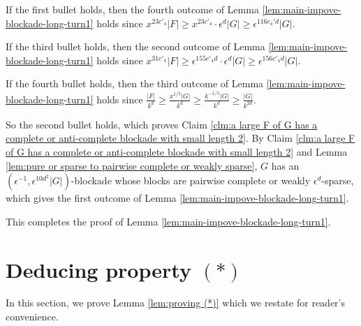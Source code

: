 \documentclass[a4paper,11pt]{article}
\let\oldendproof\endproof
\renewenvironment{proof}[1][\proofname]{%
	\oldproof[\normalfont\bfseries #1]%
}{\oldendproof}
\renewcommand{\qedsymbol}{$\square$}%
\newenvironment{subproof}[1][\normalfont\it Subproof]{%
	\renewcommand{\qedsymbol}{{\tiny{$\blacksquare$}}}%
	\begin{proof}[#1]%
	}{%
	\end{proof}%
}
\begin{document}
\begin{proof}
\begin{subproof}[Proof of Claim \ref{clm:a large F of G has a complete or anti-complete blockade with small length 2}]
            If the first bullet holds, then the fourth outcome of Lemma \ref{lem:main-impove-blockade-long-turn1} holds since $x^{23c'_4}|F|\geq x^{23c'_4}\cdot \epsilon^d|G|\geq \epsilon^{116c_4'd}|G|$. 

            If the third bullet holds, then the second outcome of Lemma \ref{lem:main-impove-blockade-long-turn1} holds since $x^{31c'_4}|F|\geq \epsilon^{155c'_4d}\cdot \epsilon^d|G|\geq \epsilon^{156c'_4d}|G|$. 
            
            If the fourth bullet holds, then the third outcome of Lemma \ref{lem:main-impove-blockade-long-turn1} holds since $\frac{|F|}{k^d}\geq \frac{x^{1/5}|G|}{k^d}\geq \frac{k^{-1/5}|G|}{k^d}\geq \frac{|G|}{k^{2d}}$. 

            So the second bullet holds, which proves Claim \ref{clm:a large F of G has a complete or anti-complete blockade with small length 2}. 
        \end{subproof}
        By Claim \ref{clm:a large F of G has a complete or anti-complete blockade with small length 2} and Lemma \ref{lem:pure or sparse to pairwise complete or weakly sparse}, $G$ has an $(\epsilon^{-1}, \epsilon^{10d^2}|G|)$-blockade whose blocks are pairwise complete or weakly $\epsilon^d$-sparse, which gives the first outcome of Lemma \ref{lem:main-impove-blockade-long-turn1}. 

        This completes the proof of Lemma \ref{lem:main-impove-blockade-long-turn1}. 
    \end{proof}


\section{Deducing property $(*)$}\label{sec:proving (*)}
    In this section, we prove Lemma \ref{lem:proving (*)} which we restate for reader's convenience.
    
\end{document}
